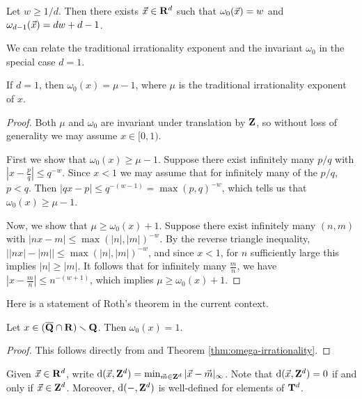 \begin{theorem}\label{thm:jarnik}
Let $w\geqslant 1/d$. Then there exists $\vec{x}\in \mathbf{R}^d$ such that 
$\omega_0(\vec{x})=w$ and $\omega_{d-1}(\vec{x}) = d w+d-1$. 
\end{theorem}

We can relate the traditional irrationality exponent and the invariant 
$\omega_0$ in the special case $d = 1$. 

\begin{theorem}\label{thm:omega-irrationality}
If $d=1$, then $\omega_0(x) = \mu-1$, where $\mu$ is the 
traditional irrationality exponent of $x$. 
\end{theorem}
\begin{proof}
Both $\mu$ and $\omega_0$ are invariant under translation by $\mathbf{Z}$, so without 
loss of generality we may assume $x\in [0,1)$. 

First we show that $\omega_0(x)\geqslant \mu-1$. Suppose there exist infinitely 
many $p/q$ with $\left| x - \frac p q\right| \leqslant q^{-w}$. Since $x<1$ we 
may assume that for infinitely many of the $p/q$, $p<q$. Then 
$| q x - p| \leqslant q^{-(w - 1)} = \max(p,q)^{-w}$, which tells us that 
$\omega_0(x) \geqslant \mu - 1$. 

Now, we show that $\mu \geqslant \omega_0(x) + 1$. Suppose there exist 
infinitely many $(n,m)$ with $|n x - m| \leqslant \max(|n|,|m|)^{-w}$. By the 
reverse triangle inequality, 
$\left| |n x| - |m|\right| \leqslant \max(|n|,|m|)^{-w}$, and since 
$x<1$, for $n$ sufficiently large this implies $|n| \geqslant |m|$. It follows 
that for infinitely many $\frac m n$, we have 
$\left| x - \frac m n\right| \leqslant n^{-(w + 1)}$, which implies 
$\mu \geqslant \omega_0(x) + 1$. 
\end{proof}

Here is a statement of Roth's theorem in the current context. 

\begin{theorem}[Roth]
Let $x\in (\overline{\mathbf{Q}}\cap \mathbf{R})\smallsetminus \mathbf{Q}$. Then 
$\omega_0(x) = 1$. 
\end{theorem}
\begin{proof}
This follows directly from \cite{roth-1955} and Theorem 
\ref{thm:omega-irrationality}.
\end{proof}

Given $\vec{x}\in \mathbf{R}^d$, write 
$\mathrm{d}(\vec{x},\mathbf{Z}^d)=\min_{\vec{m}\in \mathbf{Z}^d} |\vec{x}-\vec{m}|_\infty$. Note that 
$\mathrm{d}(\vec{x},\mathbf{Z}^d)=0$ if and only if $\vec{x}\in \mathbf{Z}^d$. Moreover, $\mathrm{d}(-,\mathbf{Z}^d)$ 
is well-defined for elements of $\mathbf{T}^d$. 

